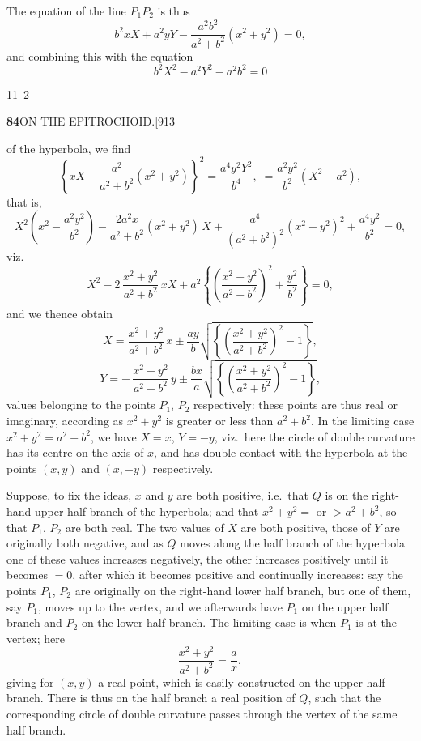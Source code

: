 \documentclass[11pt]{article}
\begin{document}
\hspace{1em} The equation of the line $P_{1}P_{2}$ is thus
\[
b^{2}xX+a^{2}yY-\frac{a^{2}b^{2}}{a^{2}+b^{2}}(x^{2}+y^{2})=0,
\]
and combining this with the equation
\[
b^{2}X^{2}-a^{2}Y^{2}-a^{2}b^{2}=0
\]

\hfill 11--2

\newpage
\noindent\textbf{84}\hfill ON THE EPITROCHOID.\hfill[913

\smallskip
of the hyperbola, we find
\[
\left\{xX-\frac{a^{2}}{a^{2}+b^{2}}(x^{2}+y^{2})\right\}^{2}=\frac{a^{4}y^{2}Y^{2}}{b^{4}},
\;=\frac{a^{2}y^{2}}{b^{2}}(X^{2}-a^{2}),
\]
that is,
\[
X^{2}\!\left(x^{2}-\frac{a^{2}y^{2}}{b^{2}}\right)-\frac{2a^{2}x}{a^{2}+b^{2}}(x^{2}+y^{2})\,X
+\frac{a^{4}}{(a^{2}+b^{2})^{2}}(x^{2}+y^{2})^{2}+\frac{a^{4}y^{2}}{b^{2}}=0,
\]
viz.
\[
X^{2}-2\,\frac{x^{2}+y^{2}}{a^{2}+b^{2}}\,xX+a^{2}\!\left\{\!\left(\frac{x^{2}+y^{2}}{a^{2}+b^{2}}\right)^{\!2}+\frac{y^{2}}{b^{2}}\right\}=0,
\]
and we thence obtain
\[
X=\frac{x^{2}+y^{2}}{a^{2}+b^{2}}\,x\pm\frac{ay}{b}\sqrt{\left\{\left(\frac{x^{2}+y^{2}}{a^{2}+b^{2}}\right)^{\!2}-1\right\}},
\]
\[
Y=-\,\frac{x^{2}+y^{2}}{a^{2}+b^{2}}\,y\pm\frac{bx}{a}\sqrt{\left\{\left(\frac{x^{2}+y^{2}}{a^{2}+b^{2}}\right)^{\!2}-1\right\}},
\]
values belonging to the points $P_{1}$, $P_{2}$ respectively: these points are
thus real or imaginary, according as $x^{2}+y^{2}$ is greater or less than
$a^{2}+b^{2}$. In the limiting case $x^{2}+y^{2}=a^{2}+b^{2}$, we have $X=x$,
$Y=-y$, viz.\ here the circle of double curvature has its centre on the axis
of $x$, and has double contact with the hyperbola at the points $(x,y)$ and
$(x,-y)$ respectively.

\hspace{1em} Suppose, to fix the ideas, $x$ and $y$ are both positive, i.e.\
that $Q$ is on the right-hand upper half branch of the hyperbola; and that
$x^{2}+y^{2}=$ or $>a^{2}+b^{2}$, so that $P_{1}$, $P_{2}$ are both real. The
two values of $X$ are both positive, those of $Y$ are originally both negative,
and as $Q$ moves along the half branch of the hyperbola one of these values
increases negatively, the other increases positively until it becomes $=0$,
after which it becomes positive and continually increases: say the points
$P_{1}$, $P_{2}$ are originally on the right-hand lower half branch, but one of
them, say $P_{1}$, moves up to the vertex, and we afterwards have $P_{1}$ on
the upper half branch and $P_{2}$ on the lower half branch. The limiting case
is when $P_{1}$ is at the vertex; here
\[
\frac{x^{2}+y^{2}}{a^{2}+b^{2}}=\frac{a}{x},
\]
giving for $(x,y)$ a real point, which is easily constructed on the upper half
branch. There is thus on the half branch a real position of $Q$, such that
the corresponding circle of double curvature passes through the vertex of the
same half branch.
\end{document}
